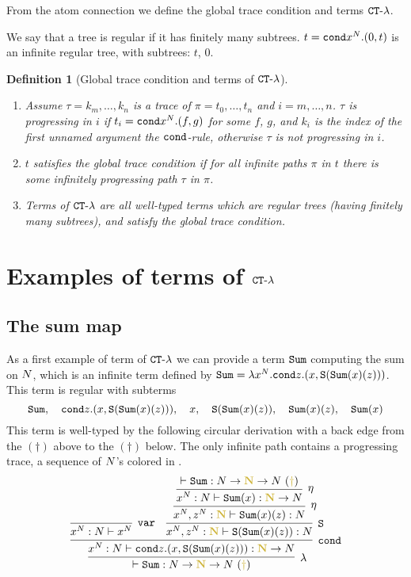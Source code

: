 \documentclass{article}
\newtheorem{definition}[theorem]{Definition}
\begin{document}
From the atom connection we define the global trace condition and terms ${ {\tt CT} \mbox{-} \lambda}$.

We say that a tree is regular if it has finitely many subtrees. $t={\tt cond} x^{N}.(0,t)$ is an infinite regular tree,
with subtrees: $t$, $0$.

\begin{definition}[Global trace condition and terms of ${ {\tt CT} \mbox{-} \lambda}$]
\begin{enumerate}
\item
Assume $\tau = k_m, \ldots, k_n$ is a trace of $\pi =t_0, \ldots, t_n$ and $i=m,\ldots, n$.
$\tau$ is progressing in $i$ if $t_i={\tt cond} x^{N}.(f,g)$ for some $f$, $g$,
and $k_i$ is the index of the first \emph{unnamed} argument the ${\tt cond}$-rule, 
otherwise $\tau$ is not progressing in $i$.

\item
$t$ satisfies the global trace condition if for all infinite paths $\pi$ in $t$ 
there is some infinitely progressing path $\tau$ in $\pi$.

\item
Terms of ${ {\tt CT} \mbox{-} \lambda}$ are all well-typed terms which are regular trees (having finitely many subtrees), 
and satisfy the global trace condition.

\end{enumerate}
\end{definition}


\section{Examples of terms of ${ {\tt CT} \mbox{-} \lambda}$}

\subsection{The sum map}
As a first example of term of  ${ {\tt CT} \mbox{-} \lambda}$ we can provide a term ${\tt Sum}$ computing the sum on ${N}$,
which is an infinite term defined by ${\tt Sum} = \lambda x^{N}.{\tt cond} z.(x,{\tt S}({\tt Sum}(x)(z)))$.
This term is regular with subterms 
$$
\Sum, \  \  \ \cond z.(x,\Succ(\Sum(x)(z))), 
\  \  \ x, \  \  \ \Succ(\Sum(x)(z)),  \  \  \ \Sum(x)(z), \  \  \ \Sum(x)
$$
This term is well-typed by the following circular derivation with a back edge from the $(\dagger)$ above to the $(\dagger)$ below.
The only infinite path contains a progressing trace, a sequence of ${N}$'s colored in 
. 
\[
\infer[\lambda]{
  \vdash \Sum:\N \rightarrow \bfColor{oldgold}{\N} \rightarrow \N\ 
(\bfColor{oldgold}{\dagger})
}{
  \infer[\cond]{
    x^\N : \N \vdash \cond z.(x,\Succ(\Sum(x)(z))): \bfColor{oldgold}{\N} \rightarrow \N
  }{
    \infer[\var]{
      x^\N : \N \vdash x^\N
    }{}
    &
    \infer[\Succ]{
      x^\N,z^\N : \bfColor{oldgold}{\N} \vdash \Succ(\Sum(x)(z)): \N
    }{
      \infer[\eta]{
        x^\N,z^\N : \bfColor{oldgold}{\N} \vdash \Sum(x)(z): \N
      }{
        \infer[\eta]{
          x^\N : \N \vdash \Sum(x): \bfColor{oldgold}{\N} \rightarrow \N
        }{
          \vdash \Sum: \N \rightarrow \bfColor{oldgold}{\N} \rightarrow \N\ 
(\bfColor{oldgold}{\dagger})
        }
      }
    }
  }
}
\]
\end{document}
